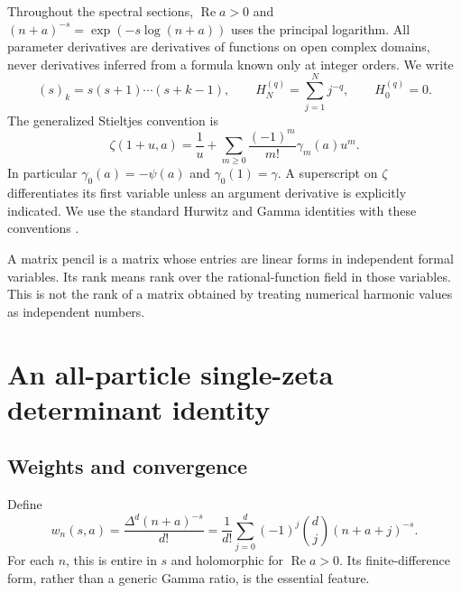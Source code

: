 \documentclass[11pt,letterpaper]{article}
\numberwithin{equation}{section}
\theoremstyle{definition}\newtheorem{definition}[theorem]{Definition}
\theoremstyle{remark}\newtheorem{remark}[theorem]{Remark}
\DeclareMathOperator{\Rea}{Re}
\begin{document}
Throughout the spectral sections, $\Rea a>0$ and
$(n+a)^{-s}=\exp(-s\log(n+a))$ uses the principal logarithm. All
parameter derivatives are derivatives of functions on open complex
domains, never derivatives inferred from a formula known only at integer
orders. We write
\[
 (s)_k=s(s+1)\cdots(s+k-1),\qquad
 H_N^{(q)}=\sum_{j=1}^N j^{-q},\qquad H_0^{(q)}=0.
\]
The generalized Stieltjes convention is
\begin{equation}\label{eq:stieltjes}
 \zeta(1+u,a)=\frac1u+
 \sum_{m\ge0}\frac{(-1)^m}{m!}\gamma_m(a)u^m.
\end{equation}
In particular $\gamma_0(a)=-\psi(a)$ and $\gamma_0(1)=\gamma$.
A superscript on $\zeta$ differentiates its first variable unless an
argument derivative is explicitly indicated. We use the standard Hurwitz
and Gamma identities with these conventions \cite{dlmf:hurwitz,dlmf:gamma}.

A matrix pencil is a matrix whose entries are linear forms in independent
formal variables. Its rank means rank over the rational-function field in
those variables. This is not the rank of a matrix obtained by treating
numerical harmonic values as independent numbers.

\section{An all-particle single-zeta determinant identity}
\label{sec:spectral}

\subsection{Weights and convergence}
Define
\begin{equation}\label{eq:weight}
 w_n(s,a)=\frac{\Delta^d(n+a)^{-s}}{d!}
 =\frac1{d!}\sum_{j=0}^{d}(-1)^j\binom dj(n+a+j)^{-s}.
\end{equation}
For each $n$, this is entire in $s$ and holomorphic for $\Rea a>0$.
Its finite-difference form, rather than a generic Gamma ratio, is the
essential feature.
\end{document}
